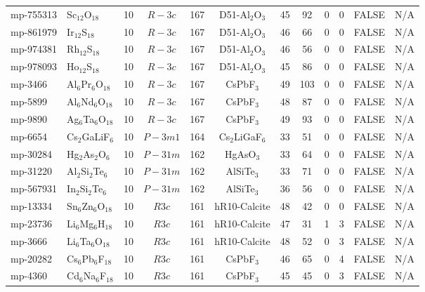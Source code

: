 {\begin{longtable}{llcccccccccc}
    mp-755313 & Sc$_{12}$O$_{18}$ & 10    & $R-3c$ & 167   & D51-Al$_{2}$O$_{3}$ & 45    & 92    & 0     & 0     & FALSE & N/A \\
    mp-861979 & Ir$_{12}$S$_{18}$ & 10    & $R-3c$ & 167   & D51-Al$_{2}$O$_{3}$ & 46    & 66    & 0     & 0     & FALSE & N/A \\
    mp-974381 & Rh$_{12}$S$_{18}$ & 10    & $R-3c$ & 167   & D51-Al$_{2}$O$_{3}$ & 46    & 56    & 0     & 0     & FALSE & N/A \\
    mp-978093 & Ho$_{12}$S$_{18}$ & 10    & $R-3c$ & 167   & D51-Al$_{2}$O$_{3}$ & 45    & 86    & 0     & 0     & FALSE & N/A \\
    mp-3466 & Al$_{6}$Pr$_{6}$O$_{18}$ & 10    & $R-3c$ & 167   & CsPbF$_{3}$ & 49    & 103   & 0     & 0     & FALSE & N/A \\
    mp-5899 & Al$_{6}$Nd$_{6}$O$_{18}$ & 10    & $R-3c$ & 167   & CsPbF$_{3}$ & 48    & 87    & 0     & 0     & FALSE & N/A \\
    mp-9890 & Ag$_{6}$Ta$_{6}$O$_{18}$ & 10    & $R-3c$ & 167   & CsPbF$_{3}$ & 49    & 93    & 0     & 0     & FALSE & N/A \\
    mp-6654 & Cs$_{2}$GaLiF$_{6}$ & 10    & $P-3m1$ & 164   & Cs$_{2}$LiGaF$_{6}$ & 33    & 51    & 0     & 0     & FALSE & N/A \\
    mp-30284 & Hg$_{2}$As$_{2}$O$_{6}$ & 10    & $P-31m$ & 162   & HgAsO$_{3}$ & 33    & 64    & 0     & 0     & FALSE & N/A \\
    mp-31220 & Al$_{2}$Si$_{2}$Te$_{6}$ & 10    & $P-31m$ & 162   & AlSiTe$_{3}$ & 33    & 71    & 0     & 0     & FALSE & N/A \\
    mp-567931 & In$_{2}$Si$_{2}$Te$_{6}$ & 10    & $P-31m$ & 162   & AlSiTe$_{3}$ & 36    & 56    & 0     & 0     & FALSE & N/A \\
    mp-13334 & Sn$_{6}$Zn$_{6}$O$_{18}$ & 10    & $R3c$ & 161   & hR10-Calcite & 48    & 42    & 0     & 0     & FALSE & N/A \\
    mp-23736 & Li$_{6}$Mg$_{6}$H$_{18}$ & 10    & $R3c$ & 161   & hR10-Calcite & 47    & 31    & 1     & 3     & FALSE & N/A \\
    mp-3666 & Li$_{6}$Ta$_{6}$O$_{18}$ & 10    & $R3c$ & 161   & hR10-Calcite & 48    & 52    & 0     & 3     & FALSE & N/A \\
    mp-20282 & Cs$_{6}$Pb$_{6}$F$_{18}$ & 10    & $R3c$ & 161   & CsPbF$_{3}$ & 46    & 65    & 0     & 4     & FALSE & N/A \\
    mp-4360 & Cd$_{6}$Na$_{6}$F$_{18}$ & 10    & $R3c$ & 161   & CsPbF$_{3}$ & 45    & 45    & 0     & 3     & FALSE & N/A \\

\end{longtable}}
